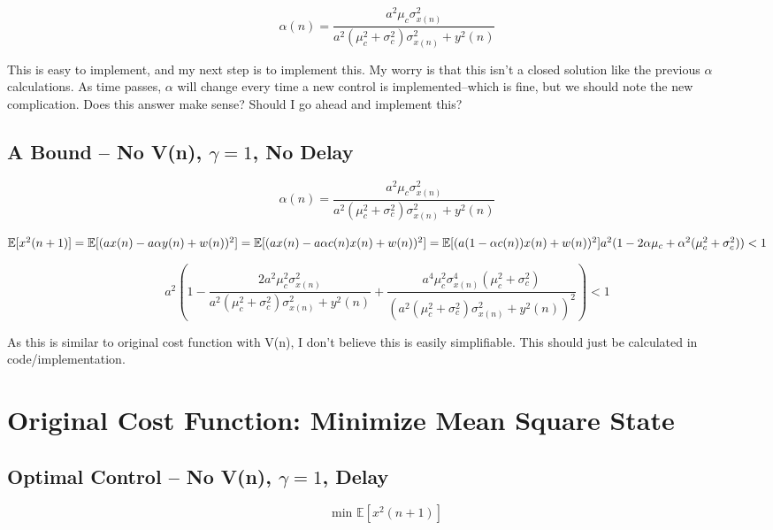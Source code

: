 \documentclass[14pt]{extarticle}
\begin{document}
\[ \alpha(n) = \frac{a^2 \mu_c \sigma_{x(n)}^2}{a^2 (\mu_c^2 + \sigma_c^2) \sigma_{x(n)}^2 + y^2(n)} \]

This is easy to implement, and my next step is to implement this. My worry is that this isn't a closed solution like the previous $\alpha$ calculations. As time passes, $\alpha$ will change every time a new control is implemented--which is fine, but we should note the new complication. Does this answer make sense? Should I go ahead and implement this?

\subsection*{A Bound -- No V(n), $\gamma = 1$, No Delay}

\[ \alpha(n) = \frac{a^2 \mu_c \sigma_{x(n)}^2}{a^2 (\mu_c^2 + \sigma_c^2) \sigma_{x(n)}^2 + y^2(n)} \]

\begin{math}
\mathbb{E} [x^2(n+1)] \\
= \mathbb{E} [( ax(n) - a\alpha y(n) + w(n) )^2] \\
= \mathbb{E} [( ax(n) - a\alpha c(n)x(n) + w(n) )^2] \\
= \mathbb{E} [( a(1-\alpha c(n))x(n) + w(n) )^2 ] \\
a^2 (1 - 2\alpha \mu_c + \alpha^2 (\mu_c^2 + \sigma_c^2) ) < 1
\end{math}

\[ a^2 \left( 1 - \frac{2 a^2 \mu_c^2 \sigma_{x(n)}^2}{a^2 (\mu_c^2 + \sigma_c^2) \sigma_{x(n)}^2 + y^2(n)} + \frac{a^4 \mu_c^2 \sigma_{x(n)}^4 (\mu_c^2 + \sigma_c^2) }{(a^2 (\mu_c^2 + \sigma_c^2) \sigma_{x(n)}^2 + y^2(n))^2} \right) < 1 \]

As this is similar to original cost function with V(n), I don't believe this is easily simplifiable. This should just be calculated in code/implementation.

\section*{Original Cost Function: Minimize Mean Square State}

\subsection*{Optimal Control -- No V(n), $\gamma = 1$, Delay}

\[ \text{min } \mathbb{E} [x^2(n+1) ] \]
\end{document}
